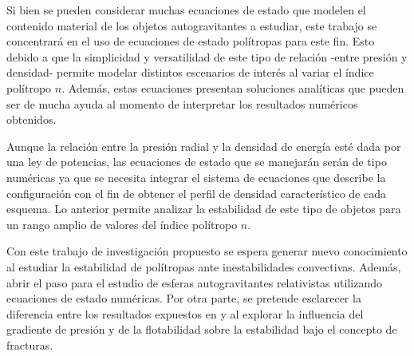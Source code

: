 \documentclass[letterpaper,11pt]{article}
\begin{document}
Si bien se pueden considerar muchas ecuaciones de estado que modelen el contenido material de los objetos autogravitantes a estudiar, este trabajo se concentrará en el uso de ecuaciones de estado polítropas \cite{herrera2013general} para este fin. Esto debido a que la simplicidad y versatilidad de este tipo de relación -entre presión y densidad- permite modelar distintos escenarios de interés al variar el índice polítropo $n$. Además, estas ecuaciones presentan soluciones analíticas que pueden ser de mucha ayuda al momento de interpretar los resultados numéricos obtenidos.

Aunque la relación entre la presión radial y la densidad de energía esté dada por una ley de potencias, las ecuaciones de estado que se manejarán serán de tipo numéricas ya que se necesita integrar el sistema de ecuaciones que describe la configuración con el fin de obtener el perfil de densidad característico de cada esquema. Lo anterior permite analizar la estabilidad de este tipo de objetos para un rango amplio de valores del índice polítropo $n$.

Con este trabajo de investigación propuesto se espera generar nuevo conocimiento al estudiar la estabilidad de polítropas ante inestabilidades convectivas. Además, abrir el paso para el estudio de esferas autogravitantes relativistas utilizando ecuaciones de estado numéricas. Por otra parte, se pretende esclarecer la diferencia entre los resultados expuestos en \cite{GonzalezNavarroNunez2015,sharif2018cracking} y \cite{hernandez2018convection} al explorar la influencia del gradiente de presión y de la flotabilidad sobre la estabilidad bajo el concepto de fracturas.








\end{document}
